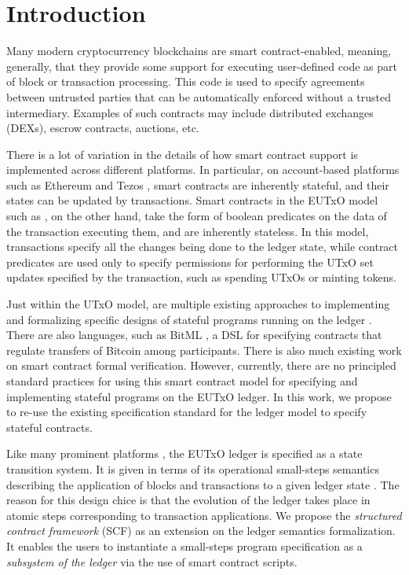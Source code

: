 \section{Introduction}
\label{sec:intro}

Many modern cryptocurrency blockchains are smart contract-enabled, meaning, generally, that
they provide some support for executing user-defined code as part of block or transaction processing.
This code is used to specify agreements between untrusted parties that can be
automatically enforced without a trusted intermediary. Examples of such
contracts may include distributed exchanges (DEXs), escrow contracts, auctions,
etc.

There is a lot of variation
in the details of how smart contract support is implemented across different platforms.
In particular, on account-based platforms such as Ethereum \cite{ethereum}
and Tezos \cite{tezos}, smart contracts are inherently stateful, and their states
can be updated by transactions. Smart contracts in
the EUTxO model such as \cite{alonzo}, on the other hand, take the form of boolean predicates
on the data of the transaction executing them, and are inherently stateless.
In this model, transactions specify all the changes being done to the ledger
state, while contract predicates are used only to specify permissions
for performing the UTxO set updates specified by the transaction, such as spending
UTxOs or minting tokens.

Just within the UTxO model, are multiple existing approaches to implementing and formalizing specific
designs of stateful programs running on the ledger \cite{eutxoma} \cite{marlowe} \cite{hydra}.
There are also languages, such as BitML \cite{bitml}, a DSL for specifying
contracts that regulate transfers of Bitcoin among participants.
There is also much existing work on smart contract formal verification.
However, currently, there are no principled standard practices for using this smart contract
model for specifying and implementing stateful programs on the EUTxO ledger.
In this work, we propose to re-use the existing specification standard for the
ledger model to specify stateful contracts.

Like many prominent platforms
\cite{tezos} \cite{ethereum} \cite{Nakamoto} \cite{nervos} \cite{zil},
the EUTxO ledger is specified as a state transition system. It is given in terms of its operational
small-steps semantics describing the application of blocks and
transactions to a given ledger state \cite{alonzo}. The reason for this
design chice is that
the evolution of the ledger takes place in atomic steps corresponding to
transaction applications. We propose the \emph{structured contract framework}
(SCF) as an extension on the ledger semantics formalization.
It enables the users
to instantiate a small-steps program specification as a \emph{subsystem of the ledger}
via the use of smart contract scripts.

